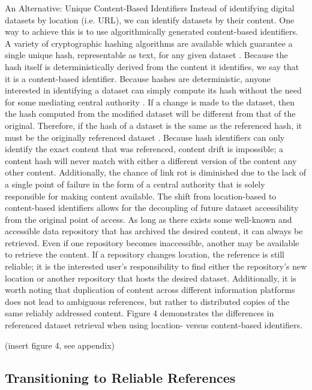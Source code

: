 An Alternative: Unique Content-Based Identifiers
Instead of identifying digital datasets by location (i.e. URL), we can identify datasets by their content. One way to achieve this is to use algorithmically generated content-based identifiers. A variety of cryptographic hashing algorithms are available which guarantee a single unique hash, representable as text, for any given dataset \citep{SHA2_2001}. Because the hash itself is deterministically derived from the content it identifies, we say that it is a content-based identifier. Because hashes are deterministic, anyone interested in identifying a dataset can simply compute its hash without the need for some mediating central authority \citep{Paskin_1999}. If a change is made to the dataset, then the hash computed from the modified dataset will be different from that of the original. Therefore, if the hash of a dataset is the same as the referenced hash, it must be the originally referenced dataset \citep{SHA2_2001}.
Because hash identifiers can only identify the exact content that was referenced, content drift is impossible; a content hash will never match with either a different version of the content any other content. Additionally, the chance of link rot is diminished due to the lack of a single point of failure in the form of a central authority that is solely responsible for making content available. The shift from location-based to content-based identifiers allows for the decoupling of future dataset accessibility from the original point of access. As long as there exists some well-known and accessible data repository that has archived the desired content, it can always be retrieved. Even if one repository becomes inaccessible, another may be available to retrieve the content. If a repository changes location, the reference is still reliable; it is the interested user’s responsibility to find either the repository’s new location or another repository that hosts the desired dataset. Additionally, it is worth noting that duplication of content across different information platforms does not lead to ambiguous references, but rather to distributed copies of the same reliably addressed content. Figure 4 demonstrates the differences in referenced dataset retrieval when using location- versus content-based identifiers.

% 
(insert figure 4, see appendix)

\subsection*{Transitioning to Reliable References}

